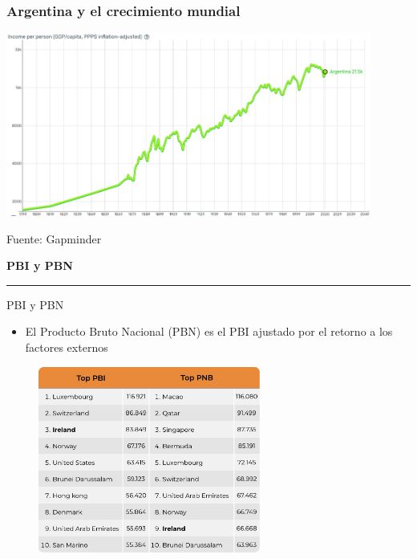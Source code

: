 \documentclass{beamer}
\begin{document}
\begin{frame}
\frametitle{Argentina y el crecimiento mundial}
\begin{center}
\href{https://www.gapminder.org/tools/#$model$markers$line$data$filter$dimensions$country$country$/$in@=usa&=chn&=arg&=bra&=nzl&=can&=aus;;;;;;&encoding$selected$data$filter$markers@=aus&=arg;;;;;;;;&chart-type=linechart&url=v1} {\includegraphics[width=0.9\textwidth]{Slides Principios de Economia/Figures/gdparg.png}}
\end{center}
Fuente: Gapminder
\end{frame}

\begin{frame}{}
\centering\huge\textbf{PBI y PBN} 
\vspace{2mm}
\hrule
\end{frame}

\begin{frame}{PBI y PBN}
    \begin{itemize}
        \item El Producto Bruto Nacional (PBN) es el PBI ajustado por el retorno a los factores externos
    \end{itemize}
\begin{figure} [h!]
    \centering
    \includegraphics[width=0.65\textwidth]{Slides Principios de Economia/Figures/T 29.1.pdf}
\end{figure}
\end{frame}
\end{document}
